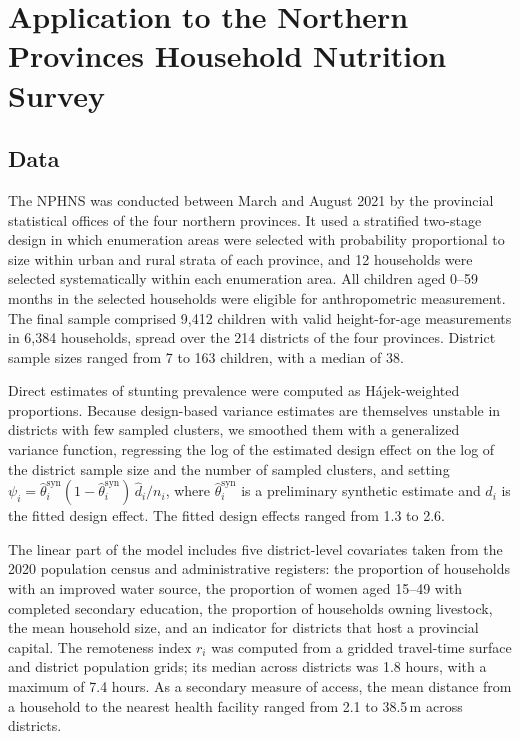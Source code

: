 \section{Application to the Northern Provinces Household Nutrition Survey}
\label{sec:application}

\subsection{Data}
\label{sec:data}

The NPHNS was conducted between March and August 2021 by the provincial
statistical offices of the four northern provinces. It used a stratified
two-stage design in which enumeration areas were selected with probability
proportional to size within urban and rural strata of each province, and 12
households were selected systematically within each enumeration area. All
children aged 0--59 months in the selected households were eligible for
anthropometric measurement. The final sample comprised 9{,}412 children with
valid height-for-age measurements in 6{,}384 households, spread over the 214
districts of the four provinces. District sample sizes ranged from 7 to 163
children, with a median of 38.

Direct estimates of stunting prevalence were computed as H\'ajek-weighted
proportions. Because design-based variance estimates are themselves unstable in
districts with few sampled clusters, we smoothed them with a generalized
variance function, regressing the log of the estimated design effect on the log
of the district sample size and the number of sampled clusters, and setting
$\psi_i = \hat\theta_i^{\mathrm{syn}} (1 - \hat\theta_i^{\mathrm{syn}})\,
\hat d_i / n_i$, where $\hat\theta_i^{\mathrm{syn}}$ is a preliminary synthetic
estimate and $\hat d_i$ is the fitted design effect. The fitted design effects
ranged from 1.3 to 2.6.

The linear part of the model includes five district-level covariates taken from
the 2020 population census and administrative registers: the proportion of
households with an improved water source, the proportion of women aged 15--49
with completed secondary education, the proportion of households owning
livestock, the mean household size, and an indicator for districts that host a
provincial capital. The remoteness index $r_i$ was computed from a gridded
travel-time surface and district population grids; its median across districts
was 1.8 hours, with a maximum of 7.4 hours. As a secondary measure of access,
the mean distance from a household to the nearest health facility ranged from
2.1 to 38.5\,m across districts.


